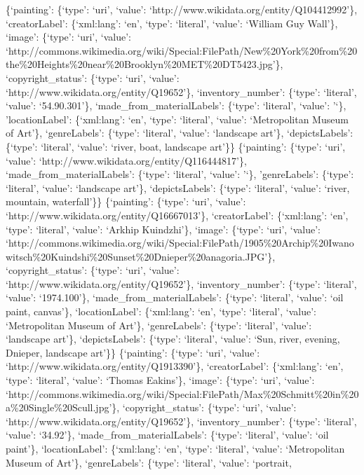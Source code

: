 \documentclass[
  letterpaper,
  DIV=11,
  numbers=noendperiod]{scrreprt}
\begin{document}
\{`painting': \{`type': `uri', `value':
`http://www.wikidata.org/entity/Q104412992'\}, `creatorLabel':
\{`xml:lang': `en', `type': `literal', `value': `William Guy Wall'\},
`image': \{`type': `uri', `value':
`http://commons.wikimedia.org/wiki/Special:FilePath/New\%20York\%20from\%20the\%20Heights\%20near\%20Brooklyn\%20MET\%20DT5423.jpg'\},
`copyright\_status': \{`type': `uri', `value':
`http://www.wikidata.org/entity/Q19652'\}, `inventory\_number':
\{`type': `literal', `value': `54.90.301'\},
`made\_from\_materialLabels': \{`type': `literal', `value': '`\},
'locationLabel': \{`xml:lang': `en', `type': `literal', `value':
`Metropolitan Museum of Art'\}, `genreLabels': \{`type': `literal',
`value': `landscape art'\}, `depictsLabels': \{`type': `literal',
`value': `river, boat, landscape art'\}\} \{`painting': \{`type': `uri',
`value': `http://www.wikidata.org/entity/Q116444817'\},
`made\_from\_materialLabels': \{`type': `literal', `value': '`\},
'genreLabels': \{`type': `literal', `value': `landscape art'\},
`depictsLabels': \{`type': `literal', `value': `river, mountain,
waterfall'\}\} \{`painting': \{`type': `uri', `value':
`http://www.wikidata.org/entity/Q16667013'\}, `creatorLabel':
\{`xml:lang': `en', `type': `literal', `value': `Arkhip Kuindzhi'\},
`image': \{`type': `uri', `value':
`http://commons.wikimedia.org/wiki/Special:FilePath/1905\%20Archip\%20Iwanowitsch\%20Kuindshi\%20Sunset\%20Dnieper\%20anagoria.JPG'\},
`copyright\_status': \{`type': `uri', `value':
`http://www.wikidata.org/entity/Q19652'\}, `inventory\_number':
\{`type': `literal', `value': `1974.100'\},
`made\_from\_materialLabels': \{`type': `literal', `value': `oil paint,
canvas'\}, `locationLabel': \{`xml:lang': `en', `type': `literal',
`value': `Metropolitan Museum of Art'\}, `genreLabels': \{`type':
`literal', `value': `landscape art'\}, `depictsLabels': \{`type':
`literal', `value': `Sun, river, evening, Dnieper, landscape art'\}\}
\{`painting': \{`type': `uri', `value':
`http://www.wikidata.org/entity/Q1913390'\}, `creatorLabel':
\{`xml:lang': `en', `type': `literal', `value': `Thomas Eakins'\},
`image': \{`type': `uri', `value':
`http://commons.wikimedia.org/wiki/Special:FilePath/Max\%20Schmitt\%20in\%20a\%20Single\%20Scull.jpg'\},
`copyright\_status': \{`type': `uri', `value':
`http://www.wikidata.org/entity/Q19652'\}, `inventory\_number':
\{`type': `literal', `value': `34.92'\}, `made\_from\_materialLabels':
\{`type': `literal', `value': `oil paint'\}, `locationLabel':
\{`xml:lang': `en', `type': `literal', `value': `Metropolitan Museum of
Art'\}, `genreLabels': \{`type': `literal', `value': `portrait,
\end{document}
